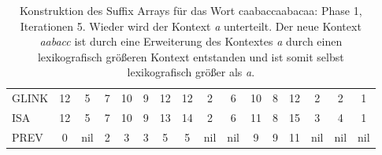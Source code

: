 \begin{table}[H]
\begin{adjustbox}{max width=\textwidth}
\begin{tabular}{lccccccccccccccc}
\multicolumn{1}{l|}{GLINK}   & 12                      & \cellcolor[HTML]{\red}5 & 7                         & 10                      & 9                                                   & 12                        & 12                         & 2                         & 6                        & 10 & 8                       & 12 & 2                         & 2                         & 1   \\
\multicolumn{1}{l|}{ISA}     & 12                      & \cellcolor[HTML]{\red}5 & 7                         & 10                      & 9                                                   & 13                        & 14                         & \cellcolor[HTML]{\red}2 & 6                        & 11 & 8                       & 15 & \cellcolor[HTML]{\red}3 & \cellcolor[HTML]{\red}4 & 1   \\
\multicolumn{1}{l|}{PREV}    & 0                       & nil                       & \cellcolor[HTML]{\red}2 & 3                       & 3                                                   & 5                         & 5                          & nil                       & nil                      & 9  & 9                       & 11 & nil                       & nil                       & nil
\end{tabular}
\end{adjustbox}

\caption[Konstruktion des Suffix Arrays f{\"u}r das Wort caabaccaabacaa: Phase 1, Iterationen 5]{Konstruktion des Suffix Arrays f{\"u}r das Wort caabaccaabacaa: Phase 1, Iterationen 5. Wieder wird der Kontext \textit{a} unterteilt. Der neue Kontext \textit{aabacc} ist durch eine Erweiterung des Kontextes \textit{a} durch einen lexikografisch gr{\"o}{\ss}eren Kontext entstanden und ist somit selbst lexikografisch gr{\"o}{\ss}er als \textit{a}.}
\label{table_complex_example_1_5} 
\end{table}

